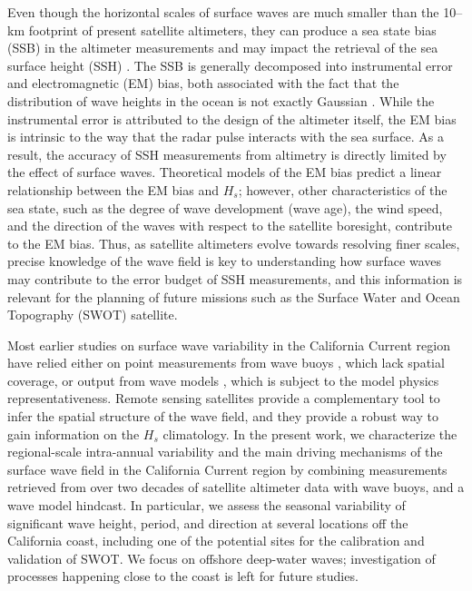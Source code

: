 Even though the horizontal scales of surface waves are much smaller than the 10--km footprint of present satellite altimeters, they can produce a sea state bias (SSB) in the altimeter measurements and may impact the retrieval of the sea surface height (SSH) \citep{fu1991effect, peral2015impact}. The SSB is generally decomposed into instrumental error and electromagnetic (EM) bias, both associated with the fact that the distribution of wave heights in the ocean is not exactly Gaussian \citep{fu1991effect, melville1991measurements}. While the instrumental error is attributed to the design of the altimeter itself, the EM bias is intrinsic to the way that the radar pulse interacts with the sea surface. As a result, the accuracy of SSH measurements from altimetry is directly limited by the effect of surface waves.
Theoretical models of the EM bias predict a linear relationship between the EM bias and $H_s$; however, other characteristics of the sea state, such as the degree of wave development (wave age), the wind speed, and the direction of the waves with respect to the satellite boresight, contribute to the EM bias. Thus, as satellite altimeters evolve towards resolving finer scales, precise knowledge of the wave field is key to understanding how surface waves may contribute to the error budget of SSH measurements, and this information is relevant for the planning of future missions such as the Surface Water and Ocean Topography (SWOT) satellite.

Most earlier studies on surface wave variability in the California Current region have relied either on point measurements from wave buoys \citep[e.g.,][]{seymour1996wave, bromirski2005wave}, which lack spatial coverage, or output from wave models \citep[e.g.,][]{wang2001changes, adams2008southern, bromirski2013wave}, which is subject to the model physics representativeness. Remote sensing satellites provide a complementary tool to infer the spatial structure of the wave field, and they provide a robust way to gain information on the $H_s$ climatology.  
In the present work, we characterize the regional-scale intra-annual variability and the main driving mechanisms of the surface wave field in the California Current region by combining measurements retrieved from over two decades of satellite altimeter data with wave buoys, and a wave model hindcast. In particular, we assess the seasonal variability of significant wave height, period, and direction at several locations off the California coast, including one of the potential sites for the calibration and validation of SWOT. We focus on offshore deep-water waves; investigation of processes happening close to the coast is left for future studies. 

